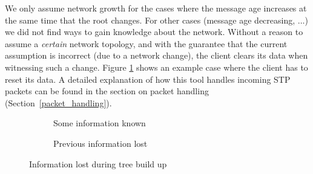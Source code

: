 We only assume network growth for the cases where the message age increases at the same time that the root changes.
For other cases (message age decreasing, ...) we did not find ways to gain knowledge about the network.
Without a reason to assume a \textit{certain} network topology, and with the guarantee that the current assumption is incorrect (due to a network change), the client clears its data when witnessing such a change.
Figure \ref{fig:information_lost} shows an example case where the client has to reset its data.
A detailed explanation of how this tool handles incoming STP packets can be found in the section on packet handling (Section~\ref{packet_handling}).

\begin{figure}[p]
    \begin{centering}
        \begin{subfigure}[b]{0.4\textwidth}
            \caption{Some information known}
        \end{subfigure}
        \hspace{1cm}
        \begin{subfigure}[b]{0.4\textwidth}
            \caption{Previous information lost}
        \end{subfigure}
        \caption{Information lost during tree build up}
        \label{fig:information_lost}
    \end{centering}
\end{figure}

